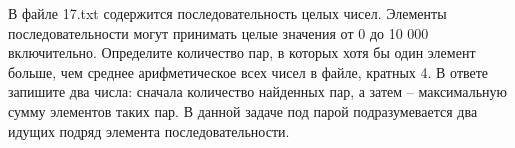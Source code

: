 \documentclass[14pt,a4paper]{article}
\begin{document}
В файле 17.txt содержится последовательность целых чисел. Элементы
последовательности могут принимать целые значения от 0 до 10 000
включительно. Определите количество пар, в которых хотя бы один
элемент больше, чем среднее арифметическое всех чисел в файле,
кратных 4. В ответе запишите два числа: сначала количество найденных
пар, а затем -- максимальную сумму элементов таких пар. В данной
задаче под парой подразумевается два идущих подряд элемента
последовательности.
\end{document}

